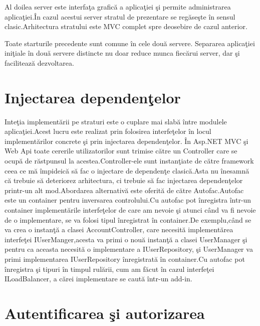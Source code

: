 \documentclass[a4paper,12pt]{report}
\begin{document}
Al doilea server este interfa\c ta grafic\u a a aplica\c tiei \c si permite administrarea aplica\c tiei.\^In cazul 
acestui server stratul de prezentare se reg\u ase\c ste \^in sensul clasic.Arhitectura stratului este MVC complet spre
deosebire de cazul anterior.

Toate starturile precedente sunt comune \^in cele dou\u a servere.
Separarea aplica\c tiei ini\c tiale \^in dou\u a servere distincte nu doar reduce munca fiec\u arui server,
dar \c si faciliteaz\u a dezvoltarea.

\section{Injectarea dependen\c telor}

Inte\c tia implement\u arii pe straturi este o cuplare mai slab\u a \^intre modulele aplica\c tiei.Acest lucru este 
realizat prin folosirea interfe\c telor \^in locul implement\u arilor concrete \c si prin injectarea dependen\c telor.
\^In Asp.NET MVC \c si Web Api toate cererile utilizatorilor sunt trimise c\u atre un Controller care se ocup\u a de
r\u astpunsul la acestea.Controller-ele sunt instan\c tiate de c\u atre framework ceea ce m\u a \^impideic\u a s\u a 
fac o injectare de dependen\c te clasic\u a.Asta nu \^inesamn\u a c\u a trebuie s\u a deteriorez  arhitectura, ci 
trebuie s\u a fac injectarea dependen\c telor printr-un alt mod.Abordarea alternativ\u a este oferit\u a de c\u atre 
Autofac.Autofac este un container pentru inversarea controlului.Cu autofac pot \^inregistra \^intr-un container 
implement\u arile interfe\c telor de care am nevoie \c si atunci c\^and va fi nevoie de o implementare, se va folosi tipul
\^inregistrat \^in container.De exemplu,c\^and se va crea o instan\c t\u a a clasei AccountController, care necesit\u a 
implement\u area interfe\c tei IUserManger,acesta va primi o nou\u a instan\c t\u a a clasei UserManager \c si pentru ca 
aceasta necesit\u a o implementare a IUserRepository, \c si UserManager va primi implementarea IUserRepository \^inregistrat\u a
\^in container.Cu autofac pot \^inregistra \c si tipuri \^in timpul rul\u arii, cum am f\u acut \^in cazul interfe\c tei 
ILoadBalancer, a c\u arei implementare se caut\u a \^intr-un add-in.



\section{Autentificarea \c si autorizarea}
\end{document}
